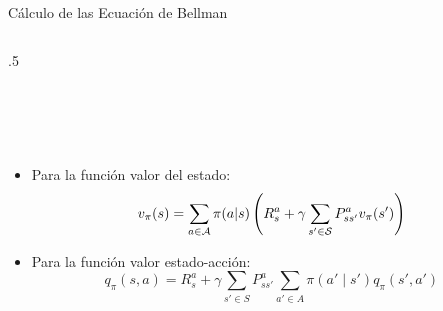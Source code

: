 \documentclass[10pt, envcountsect, handout, aspectratio=1610, hyperref={hypertexnames=true}]{beamer}
\begin{document}
\begin{frame}[t]{Cálculo de las Ecuación de Bellman}
\begin{columns}
\begin{column}{.5\textwidth}


\end{column}

\end{columns}

~

~

\vfill

\begin{itemize}
\item Para la función valor del estado:
    $$
    v_\pi(s) = \sum_{a\in{\cal A}} \pi(a|s) \left( R^{a}_s + \gamma \sum_{s'\in{\cal S}} P^{a}_{ss'} v_\pi(s') \right)
    $$

\item Para la función valor estado-acción:
    \[
    q_\pi(s, a) = R^a_s + \gamma \sum_{s' \in S} P^a_{ss'} \sum_{a' \in A} \pi(a' \mid s') q_\pi(s', a')
    \]
\end{itemize}

\end{frame}
\end{document}
